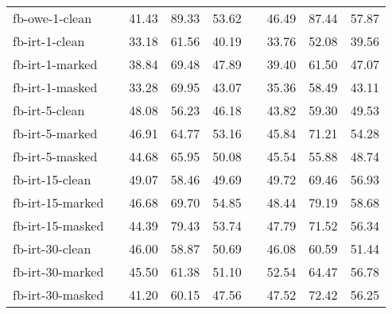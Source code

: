 \begin{tabular}{ l c r r r c r r r }
    \midrule

    fb-owe-1-clean    && 41.43 & 89.33 & 53.62 && 46.49 & 87.44 & 57.87 \\

    \addlinespace

    fb-irt-1-clean    && 33.18 & 61.56 & 40.19 && 33.76 & 52.08 & 39.56 \\
    fb-irt-1-marked   && 38.84 & 69.48 & 47.89 && 39.40 & 61.50 & 47.07 \\
    fb-irt-1-masked   && 33.28 & 69.95 & 43.07 && 35.36 & 58.49 & 43.11 \\

    \addlinespace

    fb-irt-5-clean    && 48.08 & 56.23 & 46.18 && 43.82 & 59.30 & 49.53 \\
    fb-irt-5-marked   && 46.91 & 64.77 & 53.16 && 45.84 & 71.21 & 54.28 \\
    fb-irt-5-masked   && 44.68 & 65.95 & 50.08 && 45.54 & 55.88 & 48.74 \\

    \addlinespace

    fb-irt-15-clean   && 49.07 & 58.46 & 49.69 && 49.72 & 69.46 & 56.93 \\
    fb-irt-15-marked  && 46.68 & 69.70 & 54.85 && 48.44 & 79.19 & 58.68 \\
    fb-irt-15-masked  && 44.39 & 79.43 & 53.74 && 47.79 & 71.52 & 56.34 \\

    \addlinespace

    fb-irt-30-clean   && 46.00 & 58.87 & 50.69 && 46.08 & 60.59 & 51.44 \\
    fb-irt-30-marked  && 45.50 & 61.38 & 51.10 && 52.54 & 64.47 & 56.78 \\
    fb-irt-30-masked  && 41.20 & 60.15 & 47.56 && 47.52 & 72.42 & 56.25 \\

    \bottomrule
\end{tabular}
